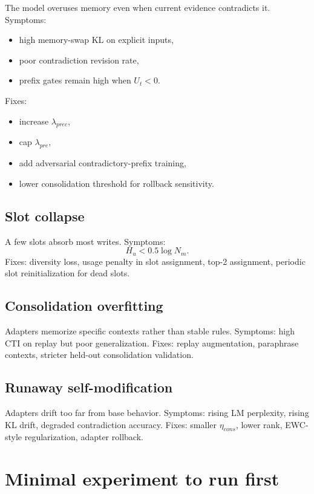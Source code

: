 \documentclass[11pt]{article}
\begin{document}
The model overuses memory even when current evidence contradicts it. Symptoms:
\begin{itemize}
    \item high memory-swap KL on explicit inputs,
    \item poor contradiction revision rate,
    \item prefix gates remain high when \(U_t<0\).
\end{itemize}
Fixes:
\begin{itemize}
    \item increase \(\lambda_{prec}\),
    \item cap \(\lambda_{pre}\),
    \item add adversarial contradictory-prefix training,
    \item lower consolidation threshold for rollback sensitivity.
\end{itemize}

\subsection{Slot collapse}

A few slots absorb most writes. Symptoms:
\begin{equation}
    H_u<0.5\log N_m.
\end{equation}
Fixes: diversity loss, usage penalty in slot assignment, top-2 assignment, periodic slot reinitialization for dead slots.

\subsection{Consolidation overfitting}

Adapters memorize specific contexts rather than stable rules. Symptoms: high CTI on replay but poor generalization. Fixes: replay augmentation, paraphrase contexts, stricter held-out consolidation validation.

\subsection{Runaway self-modification}

Adapters drift too far from base behavior. Symptoms: rising LM perplexity, rising KL drift, degraded contradiction accuracy. Fixes: smaller \(\eta_{cons}\), lower rank, EWC-style regularization, adapter rollback.

\section{Minimal experiment to run first}
\end{document}
